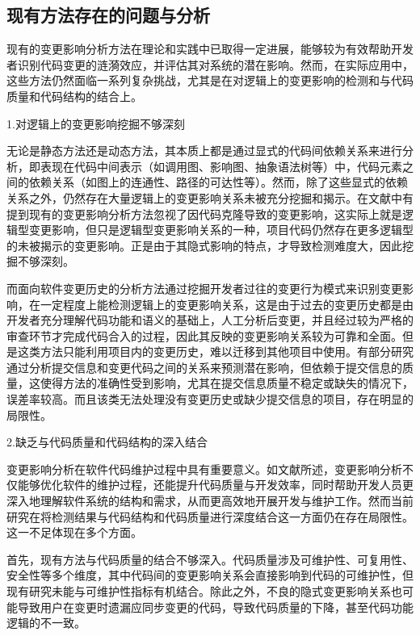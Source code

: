 \subsection{现有方法存在的问题与分析}

现有的变更影响分析方法在理论和实践中已取得一定进展，能够较为有效帮助开发者识别代码变更的涟漪效应，并评估其对系统的潜在影响。然而，在实际应用中，这些方法仍然面临一系列复杂挑战，尤其是在对逻辑上的变更影响的检测和与代码质量和代码结构的结合上。

1.对逻辑上的变更影响挖掘不够深刻

无论是静态方法还是动态方法，其本质上都是通过显式的代码间依赖关系来进行分析，即表现在代码中间表示（如调用图、影响图、抽象语法树等）中，代码元素之间的依赖关系（如图上的连通性、路径的可达性等）。然而，除了这些显式的依赖关系之外，仍然存在大量逻辑上的变更影响关系未被充分挖掘和揭示。在文献\cite{daipeng2024software}中有提到现有的变更影响分析方法忽视了因代码克隆导致的变更影响，这实际上就是逻辑型变更影响，但只是逻辑型变更影响关系的一种，项目代码仍然存在更多逻辑型的未被揭示的变更影响。正是由于其隐式影响的特点，才导致检测难度大，因此挖掘不够深刻。

而面向软件变更历史的分析方法通过挖掘开发者过往的变更行为模式来识别变更影响，在一定程度上能检测逻辑上的变更影响关系，这是由于过去的变更历史都是由开发者充分理解代码功能和语义的基础上，人工分析后变更，并且经过较为严格的审查环节才完成代码合入的过程，因此其反映的变更影响关系较为可靠和全面。但是这类方法只能利用项目内的变更历史，难以迁移到其他项目中使用。有部分研究通过分析提交信息和变更代码之间的关系来预测潜在影响，但依赖于提交信息的质量，这使得方法的准确性受到影响，尤其在提交信息质量不稳定或缺失的情况下，误差率较高。而且该类无法处理没有变更历史或缺少提交信息的项目，存在明显的局限性。


2.缺乏与代码质量和代码结构的深入结合

变更影响分析在软件代码维护过程中具有重要意义。如文献\cite{KRETSOU2021110892}所述，变更影响分析不仅能够优化软件的维护过程，还能提升代码质量与开发效率，同时帮助开发人员更深入地理解软件系统的结构和需求，从而更高效地开展开发与维护工作。然而当前研究在将检测结果与代码结构和代码质量进行深度结合这一方面仍在存在局限性。这一不足体现在多个方面。

首先，现有方法与代码质量的结合不够深入。代码质量涉及可维护性、可复用性、安全性等多个维度，其中代码间的变更影响关系会直接影响到代码的可维护性，但现有研究未能与可维护性指标有机结合。除此之外，不良的隐式变更影响关系也可能导致用户在变更时遗漏应同步变更的代码，导致代码质量的下降，甚至代码功能逻辑的不一致。

